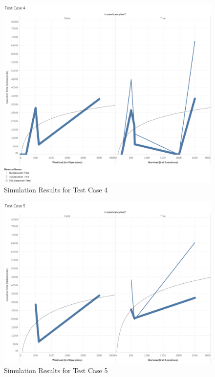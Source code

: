 \begin{figure}
\centering
\includegraphics[scale=0.23]{images/TestCase4(WL).png}
\caption{Simulation Results for Test Case 4}
\label{results:test_case_graphs_4}
\end{figure}

\begin{figure}
\centering
\includegraphics[scale=0.23]{images/TestCase5(WL).png}
\caption{Simulation Results for Test Case 5}
\label{results:test_case_graphs_5}
\end{figure}

